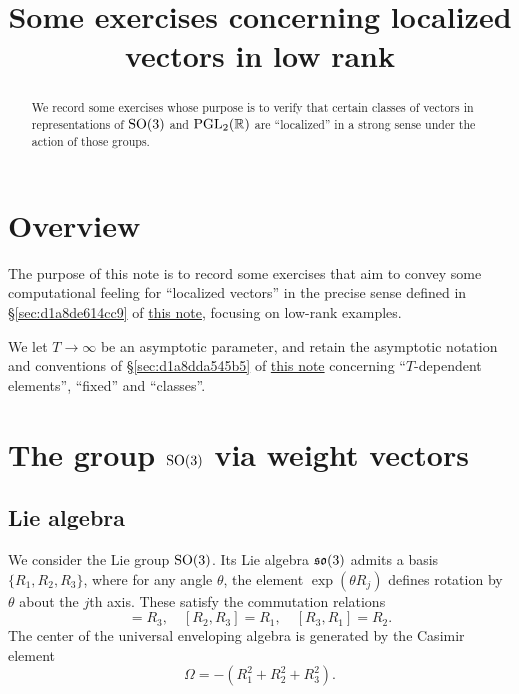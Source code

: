 \documentclass[reqno]{amsart} 
\title{Some exercises concerning localized vectors in low rank}
\numberwithin{equation}{section}
\numberwithin{theorem}{section}
\begin{document}
\maketitle
\tableofcontents


\begin{abstract}
We record some exercises whose purpose is to verify that certain classes of vectors in representations of $\operatorname{SO}(3)$ and $\operatorname{PGL}_2(\mathbb{R})$ are ``localized'' in a strong sense under the action of those groups.  
\end{abstract}

\section{Overview}\label{sec:d1a9162ede03}

The purpose of this note is to record some exercises that aim to convey some computational feeling for ``localized vectors'' in the precise sense defined in \S\ref{sec:d1a8de614cc9} of \href{20230522T150333__microlocal-localized-vectors.pdf}{this note}, focusing on low-rank examples.

We let $T \rightarrow \infty$ be an asymptotic parameter, and retain the asymptotic notation and conventions of \S\ref{sec:d1a8dda545b5} of \href{20230522T150333__microlocal-localized-vectors.pdf}{this note} concerning ``$T$-dependent elements'', ``fixed'' and ``classes''.

\section{The group $\operatorname{SO}(3)$ via weight vectors}\label{sec:d1a9162ed4bc}

\subsection{Lie algebra}\label{sec:d1a9162ece67}
We consider the Lie group $\operatorname{SO}(3)$.  Its Lie algebra $\operatorname{\mathfrak{s}\mathfrak{o}}(3)$ admits a basis $\{R_1, R_2, R_3\}$, where for any angle $\theta$, the element $\exp(\theta R_j)$ defines rotation by $\theta$ about the $j$th axis.  These satisfy the commutation relations
\begin{equation*} [R_1,R_2] = R_3, \quad [R_2,R_3] = R_1, \quad [R_3,R_1] = R_2.
\end{equation*}
The center of the universal enveloping algebra is generated by the Casimir element
\begin{equation*}
  \Omega = -(R_1^2 + R_2^2 + R_3^2).
\end{equation*}
\end{document}
